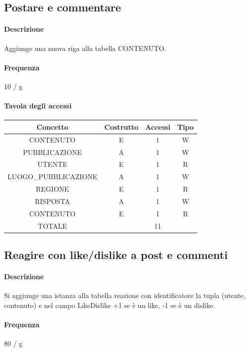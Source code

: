 \documentclass[a4paper,12pt]{report}
\begin{document}
\subsection{Postare e commentare} \label{postare}
\paragraph{Descrizione}
Aggiunge una nuova riga alla tabella CONTENUTO.
\paragraph{Frequenza} 10 / g
\begin{table}[H]
\paragraph{Tavola degli accessi\newline}
\begin{tabular}{|c|c|c|c|}
\hline
Concetto             & Costrutto & Accessi & Tipo \\ \hline
CONTENUTO            & E         & 1       & W    \\ \hline
PUBBLICAZIONE        & A         & 1       & W    \\ \hline
UTENTE               & E         & 1       & R    \\ \hline
LUOGO\_PUBBLICAZIONE & A         & 1       & W    \\ \hline
REGIONE              & E         & 1       & R    \\ \hline
RISPOSTA             & A         & 1       & W    \\ \hline
CONTENUTO            & E         & 1       & R    \\ \hline
TOTALE               &           & 11      &      \\ \hline
\end{tabular}
\end{table}
\subsection{Reagire con like/dislike a post e commenti} \label{like}
\paragraph{Descrizione} Si aggiunge una istanza alla tabella reazione con identificatore la tupla (utente, contenuto) e nel campo LikeDislike +1 se è un like, -1 se è un dislike.
\paragraph{Frequenza} 80 / g
\end{document}
